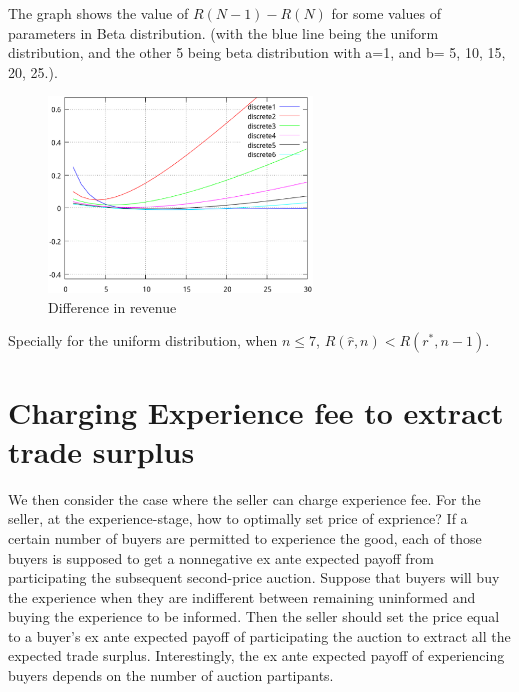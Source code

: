 \documentclass[review]{elsarticle}
\begin{document}
The  graph shows the value of $R(N-1)-R(N)$ for some
values of parameters in Beta distribution.
(with the blue line being the uniform distribution, and the other 5 being beta distribution with a=1, and b= 5, 10, 15, 20, 25.).
\begin{figure}
\centering
\includegraphics[width = 7cm]{mypic.eps}
\caption{Difference in revenue} \label{fig:graph}
\end{figure}
Specially for the uniform distribution, when $n\leq 7$, $R(\hat{r},n)<R(r^*,n-1)$.
\section{Charging Experience fee to extract trade surplus}
  We then consider the case where the seller can charge experience fee. For the seller, at the experience-stage, how to optimally set price of exprience?
If a certain number of buyers are permitted to experience the good, each of those buyers is supposed to  get a nonnegative ex ante expected payoff from participating the
subsequent second-price auction.  Suppose that buyers will buy the experience when they are indifferent between remaining
uninformed and buying the experience to be informed.
 Then the seller should set the price equal to a buyer's ex ante expected payoff of participating the auction to extract all the expected trade surplus.
 Interestingly, the ex ante expected payoff of experiencing buyers  depends on the number of auction partipants.
\end{document}
